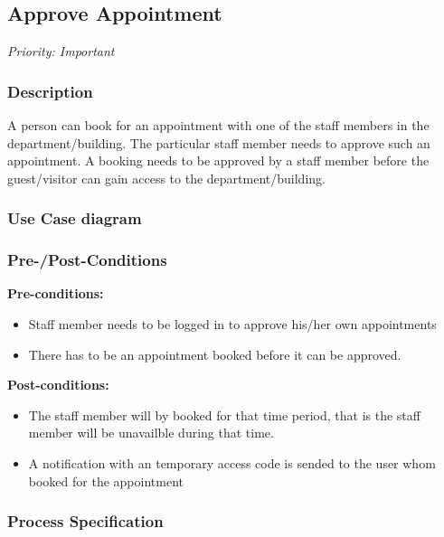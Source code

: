 \subsection{Approve Appointment}
\textit{Priority: Important} \\

\subsubsection{Description}
A person can book for an appointment with one of the staff members in the department/building. The particular staff member needs to approve such an appointment. A booking needs to be approved by a staff member before the guest/visitor can gain access to the department/building.

\subsubsection{Use Case diagram}

\subsubsection{Pre-/Post-Conditions}
\textbf{Pre-conditions:} 
	\begin{itemize}
		\item Staff member needs to be logged in to approve his/her own appointments
		\item There has to be an appointment booked before it can be approved.
	\end{itemize}
\textbf{ Post-conditions:} 
	\begin{itemize}
		\item The staff member will by booked for that time period, that is the staff member will be unavailble during that time.
		\item A notification with an temporary access code is sended to the user whom booked for the appointment
	\end{itemize}
	
\subsubsection{Process Specification}
